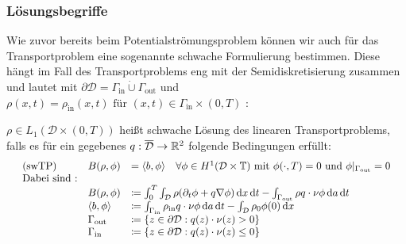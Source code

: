 \subsubsection{Lösungsbegriffe}
	Wie zuvor bereits beim Potentialströmungsproblem können wir auch für das Transportproblem eine sogenannte schwache Formulierung bestimmen. Diese hängt im Fall des Transportproblems eng mit der Semidiskretisierung zusammen und lautet mit $ \partial \mathcal{D} = \Gamma_{\text{in}} \dot{\cup} \Gamma_{\text{out}} $ und 
$\rho(x,t) = \rho_{\text{in}}(x,t) \text{ für } (x,t) \in \Gamma_{\text{in}} \times (0,T)$ :
\begin{Definition} 
	$ \rho \in L_1 (\mathcal{D} \times (0,T)) $ heißt schwache Lösung des linearen Transportproblems, falls es für ein gegebenes $ q : \overline{\mathcal{D}} \to \mathbb{R}^2 $ folgende Bedingungen erfüllt:
	\begin{align*}
	\begin{array}{rllll}
	&\text{(swTP)} \ &B(\rho,\phi) &= \langle b,\phi\rangle \quad \forall \phi \in H^1(\mathcal{D}\times\mathbb{T}) \text{ mit } \phi(\cdot,T) = 0 \text{ und } \phi|_{\Gamma_{\text{out}}} = 0 \\
	&\text{Dabei sind :} & & &\\
	& &B(\rho,\phi) &\coloneqq  \int_{0}^{T} \int_{\mathcal{D}} \rho (\partial_t \phi + q \nabla \phi ) \, \mathrm{d} x \, \mathrm{d} t - \int_{\Gamma_{\text{out}}} \rho q \cdot \nu \phi \, \mathrm{d} a  \, \mathrm{d} t \\
	& &\langle b,\phi \rangle &\coloneqq \int_{\Gamma_{\text{in}}} \rho_{\text{in}} q \cdot \nu \phi \, \mathrm{d} a  \, \mathrm{d} t - \int_{\mathcal{D}} \rho_0 \phi(0) \, \mathrm{d} x \\
	& & \Gamma_{\text{out}} &\coloneqq  \{ z \in \partial \mathcal{D}: q(z)\cdot \nu(z) > 0 \} & \\
	& & \Gamma_{\text{in}} &\coloneqq  \{ z \in \partial \mathcal{D}: q(z)\cdot \nu(z) \leq 0 \} &
	\end{array}\\
	\end{align*}
\end{Definition}
%	

